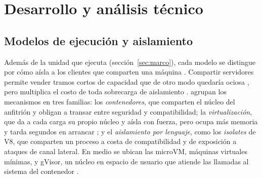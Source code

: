 \documentclass[12pt, letterpaper, table, xcdraw]{inf-pucv}
\begin{document}
\section{Desarrollo y análisis técnico}


\subsection{Modelos de ejecución y aislamiento}
\label{sec:modelos}

Además de la unidad que ejecuta (sección~\ref{sec:marco}), cada modelo se distingue por cómo aísla a los clientes que comparten una máquina \parencite{shafiei2022}. Compartir servidores permite vender tramos cortos de capacidad que de otro modo quedaría ociosa \parencite{liu2024demystifying}, pero multiplica el costo de toda sobrecarga de aislamiento \parencite{agache2020}. \textcite{agache2020} agrupan los mecanismos en tres familias: los \textit{contenedores}, que comparten el núcleo del anfitrión y obligan a transar entre seguridad y compatibilidad; la \textit{virtualización}, que da a cada carga su propio núcleo y aísla con fuerza, pero ocupa más memoria y tarda segundos en arrancar \parencite{wen2023}; y el \textit{aislamiento por lenguaje}, como los \textit{isolates} de V8, que comparten un proceso a costa de compatibilidad y de exposición a ataques de canal lateral. En medio se ubican las microVM, máquinas virtuales mínimas, y gVisor, un núcleo en espacio de usuario que atiende las llamadas al sistema del contenedor \parencite{wang2022}.
\end{document}
